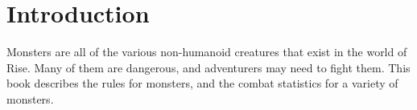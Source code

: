 \chapter{Introduction}

Monsters are all of the various non-humanoid creatures that exist in the world of Rise.
Many of them are dangerous, and adventurers may need to fight them.
This book describes the rules for monsters, and the combat statistics for a variety of monsters.

